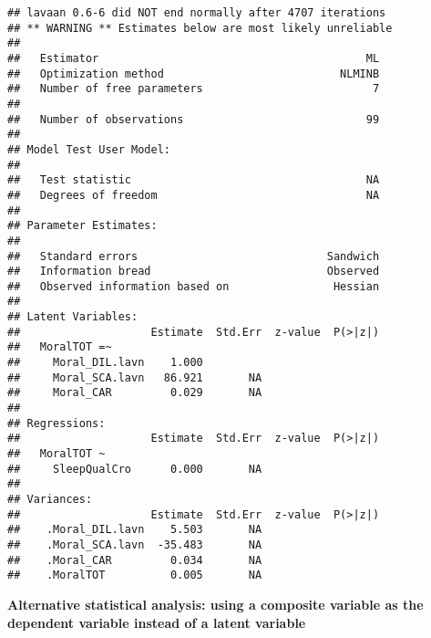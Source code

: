 \documentclass[
]{book}
\begin{document}
\begin{verbatim}
## lavaan 0.6-6 did NOT end normally after 4707 iterations
## ** WARNING ** Estimates below are most likely unreliable
## 
##   Estimator                                         ML
##   Optimization method                           NLMINB
##   Number of free parameters                          7
##                                                       
##   Number of observations                            99
##                                                       
## Model Test User Model:
##                                                       
##   Test statistic                                    NA
##   Degrees of freedom                                NA
## 
## Parameter Estimates:
## 
##   Standard errors                             Sandwich
##   Information bread                           Observed
##   Observed information based on                Hessian
## 
## Latent Variables:
##                    Estimate  Std.Err  z-value  P(>|z|)
##   MoralTOT =~                                         
##     Moral_DIL.lavn    1.000                           
##     Moral_SCA.lavn   86.921       NA                  
##     Moral_CAR         0.029       NA                  
## 
## Regressions:
##                    Estimate  Std.Err  z-value  P(>|z|)
##   MoralTOT ~                                          
##     SleepQualCro      0.000       NA                  
## 
## Variances:
##                    Estimate  Std.Err  z-value  P(>|z|)
##    .Moral_DIL.lavn    5.503       NA                  
##    .Moral_SCA.lavn  -35.483       NA                  
##    .Moral_CAR         0.034       NA                  
##    .MoralTOT          0.005       NA
\end{verbatim}

\textbf{Alternative statistical analysis: using a composite variable as the dependent variable instead of a latent variable}
\end{document}
